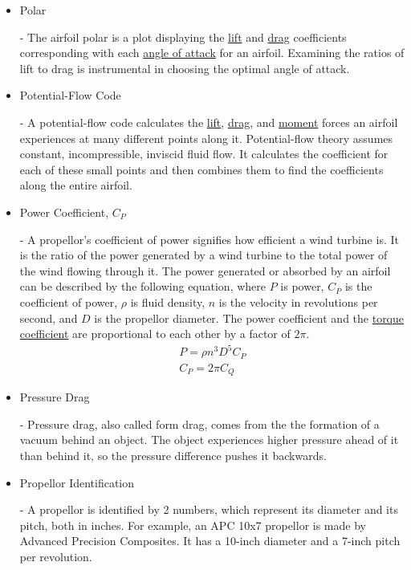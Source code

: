 \documentclass{article}
\begin{document}
\begin{itemize}
	\item \hypertarget{AP}{Polar} - The airfoil polar is a plot displaying the  \hyperlink{CL}{lift} and  \hyperlink{CD}{drag} coefficients corresponding with each \hyperlink{alpha}{angle of attack} for an airfoil. Examining the ratios of lift to drag is instrumental in choosing the optimal angle of attack.
	
	\item \hypertarget{PFC}{Potential-Flow Code} - A potential-flow code calculates the \hyperlink{CL}{lift}, \hyperlink{CD}{drag}, and \hyperlink{CM}{moment} forces an airfoil experiences at many different points along it. Potential-flow theory assumes constant, incompressible, inviscid fluid flow. It calculates the coefficient for each of these small points and then combines them to find the coefficients along the entire airfoil.
	
	\item \hypertarget{CP}{Power Coefficient, $C_{P}$} - A propellor's coefficient of power signifies how efficient a wind turbine is. It is the ratio of the power generated by a wind turbine to the total power of the wind flowing through it. The power generated or absorbed by an airfoil can be described by the following equation, where $P$ is power, $C_{P}$ is the coefficient of power, $\rho$ is fluid density, $n$ is the velocity in revolutions per second, and $D$ is the propellor diameter. The power coefficient and the \hyperlink{CT}{torque coefficient} are proportional to each other by a factor of $2\pi$.
	\begin{equation}
	\begin{aligned}
		P = \rho n^{3} D^{5} C_{P} \\
		C_{P} = 2 \pi C_{Q}
	\end{aligned}
	\end{equation}
		
	\item \hypertarget{DP}{Pressure Drag} - Pressure drag, also called form drag, comes from the the formation of a vacuum behind an object. The object experiences higher pressure ahead of it than behind it, so the pressure difference pushes it backwards.
	
	\item \hypertarget{APC}{Propellor Identification} - A propellor is identified by 2 numbers, which represent its diameter and its pitch, both in inches. For example, an APC 10x7 propellor is made by Advanced Precision Composites. It has a 10-inch diameter and a 7-inch pitch per revolution.
	

\end{itemize}
\end{document}
